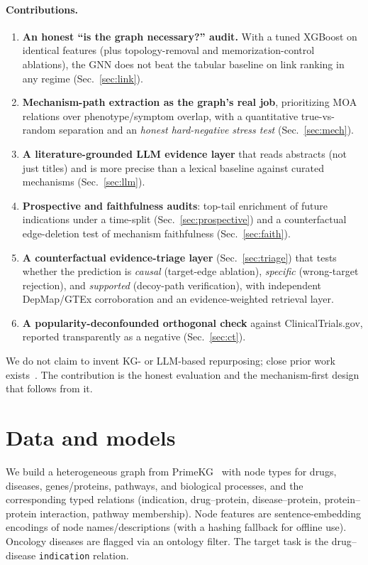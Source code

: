\documentclass[11pt]{article}
\begin{document}
\paragraph{Contributions.}
\begin{enumerate}[leftmargin=1.5em,itemsep=2pt,topsep=2pt]
\item \textbf{An honest ``is the graph necessary?'' audit.} With a tuned XGBoost on
identical features (plus topology-removal and memorization-control ablations), the GNN does
not beat the tabular baseline on link ranking in any regime (Sec.~\ref{sec:link}).
\item \textbf{Mechanism-path extraction as the graph's real job}, prioritizing MOA relations
over phenotype/symptom overlap, with a quantitative true-vs-random separation and an
\emph{honest hard-negative stress test} (Sec.~\ref{sec:mech}).
\item \textbf{A literature-grounded LLM evidence layer} that reads abstracts (not just
titles) and is more precise than a lexical baseline against curated mechanisms
(Sec.~\ref{sec:llm}).
\item \textbf{Prospective and faithfulness audits}: top-tail enrichment of future
indications under a time-split (Sec.~\ref{sec:prospective}) and a counterfactual
edge-deletion test of mechanism faithfulness (Sec.~\ref{sec:faith}).
\item \textbf{A counterfactual evidence-triage layer} (Sec.~\ref{sec:triage}) that tests
whether the prediction is \emph{causal} (target-edge ablation), \emph{specific}
(wrong-target rejection), and \emph{supported} (decoy-path verification), with independent
DepMap/GTEx corroboration and an evidence-weighted retrieval layer.
\item \textbf{A popularity-deconfounded orthogonal check} against ClinicalTrials.gov,
reported transparently as a negative (Sec.~\ref{sec:ct}).
\end{enumerate}
We do not claim to invent KG- or LLM-based repurposing; close prior work
exists~\cite{txgnn,kgmlxdtd}. The contribution is the honest evaluation and the
mechanism-first design that follows from it.

\section{Data and models}
We build a heterogeneous graph from PrimeKG~\cite{primekg} with node types for drugs,
diseases, genes/proteins, pathways, and biological processes, and the corresponding typed
relations (indication, drug--protein, disease--protein, protein--protein interaction,
pathway membership). Node features are sentence-embedding encodings of node names/descriptions
(with a hashing fallback for offline use). Oncology diseases are flagged via an ontology
filter. The target task is the drug--disease \texttt{indication} relation.
\end{document}
